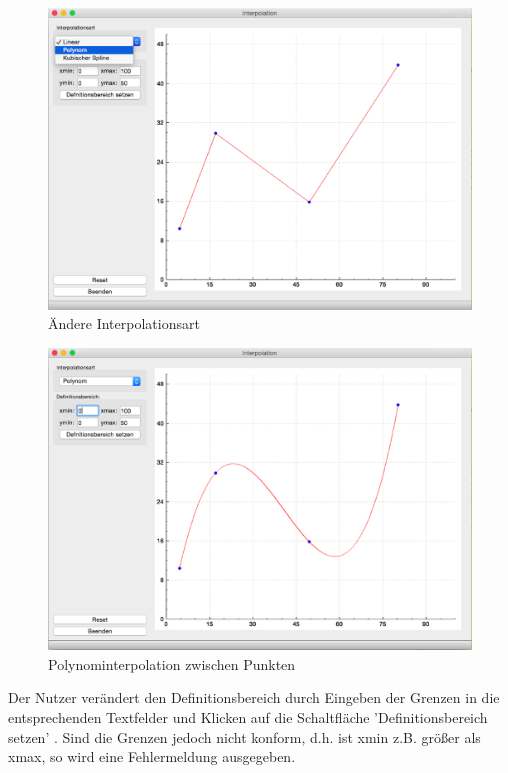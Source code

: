 \begin{figure}[H]
\centering
\includegraphics[width=\textwidth]{figures/change_interpol_screen.eps}
\caption{\"Andere Interpolationsart}
\end{figure}

\begin{figure}[H]
\centering
\includegraphics[width=\textwidth]{figures/polynom_interpol_screen.eps}
\caption{Polynominterpolation zwischen Punkten}
\end{figure}

\noindent Der Nutzer ver\"andert den Definitionsbereich durch Eingeben der Grenzen in die entsprechenden Textfelder und Klicken auf die Schaltfl\"ache 'Definitionsbereich setzen' . Sind die Grenzen jedoch nicht konform, d.h. ist xmin z.B. gr\"o\ss er als xmax, so wird eine Fehlermeldung ausgegeben.\\

